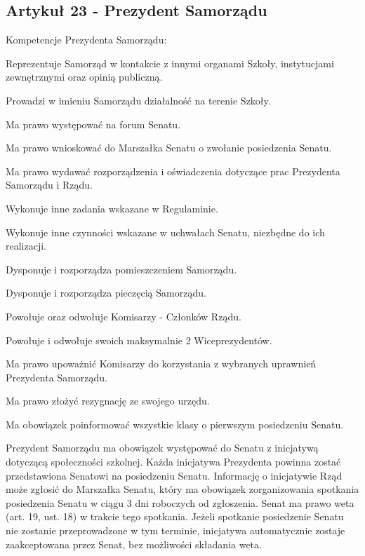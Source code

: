 \documentclass[14pt]{article}
\newcounter{podpunktyCounter}
\newenvironment{podpunkty}
{%
	\begin{list}{\arabic{podpunktyCounter})}%
		{%
			\usecounter{podpunktyCounter}
			\setlength{\itemsep}{1pt}
			\setlength{\topsep}{3pt}
		}%
	}%
	{\end{list}}
\newenvironment{ustepy}{%
	\begin{enumerate}[leftmargin=1.5em, itemindent=1pt, labelwidth=1em, itemsep=5pt]
	}{%
	\end{enumerate}
}
\begin{document}
\subsection*{Artykuł 23 - Prezydent Samorządu}
\begin{ustepy}
	
	\item Kompetencje Prezydenta Samorządu:
	\begin{podpunkty}
		\item Reprezentuje Samorząd w kontakcie z innymi organami Szkoły, instytucjami zewnętrznymi oraz opinią publiczną.
		\item Prowadzi w imieniu Samorządu działalność na terenie Szkoły.
		\item Ma prawo występować na forum Senatu.
		\item Ma prawo wnioskować do Marszałka Senatu o zwołanie posiedzenia Senatu.
		\item Ma prawo wydawać rozporządzenia i oświadczenia dotyczące prac Prezydenta Samorządu i Rządu.
		\item Wykonuje inne zadania wskazane w Regulaminie.
		\item Wykonuje inne czynności wskazane w uchwałach Senatu, niezbędne do ich realizacji.
		\item Dysponuje i rozporządza pomieszczeniem Samorządu.
		\item Dysponuje i rozporządza pieczęcią Samorządu.
		\item Powołuje oraz odwołuje Komisarzy - Członków Rządu.
		\item Powołuje i odwołuje swoich maksymalnie 2 Wiceprezydentów.
		\item Ma prawo upoważnić Komisarzy do korzystania z wybranych uprawnień Prezydenta Samorządu.
		\item Ma prawo złożyć rezygnację ze swojego urzędu.
		\item Ma obowiązek poinformować wszystkie klasy o pierwszym posiedzeniu Senatu.
	\end{podpunkty}
	
	\item Prezydent Samorządu ma obowiązek występować do Senatu z inicjatywą dotyczącą społeczności szkolnej. Każda inicjatywa Prezydenta powinna zostać przedstawiona Senatowi na posiedzeniu Senatu. Informację o inicjatywie Rząd może zgłosić do Marszałka Senatu, który ma obowiązek zorganizowania spotkania posiedzenia Senatu w ciągu 3 dni roboczych od zgłoszenia. Senat ma prawo weta (art. 19, ust. 18) w trakcie tego spotkania. Jeżeli spotkanie posiedzenie Senatu nie zostanie przeprowadzone w tym terminie, inicjatywa automatycznie zostaje zaakceptowana przez Senat, bez możliwości składania weta.
\end{ustepy}
\end{document}
